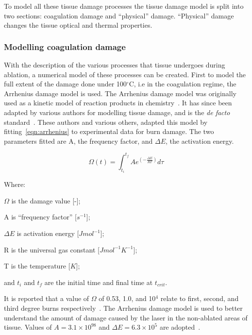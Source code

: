 To model all these tissue damage processes the tissue damage model is split into two sections: coagulation damage and ``physical'' damage. ``Physical'' damage changes the tissue optical and thermal properties.

\subsubsection*{Modelling coagulation damage}\label{sec:coagdamage}
With the description of the various processes that tissue undergoes during ablation, a numerical model of these processes can be created.
First to model the full extent of the damage done under 100${^{\circ}}$C, i.e in the coagulation regime, the Arrhenius damage model is used. The Arrhenius damage model was originally used as a kinetic model of reaction products in chemistry~\cite{pearce2009relationship}. It has since been adapted by various authors for modelling tissue damage, and is the \textit{de facto} standard~\cite{hendriques1947studies,jiang2002effects}. These authors and various others, adapted this model by fitting~\cref{eqn:arrhenius} to experimental data for burn damage. The two parameters fitted are A, the frequency factor, and $\Delta E$, the activation energy.

\begin{equation}
\Omega(t)=\int^{t_{f}}_{t_i} Ae^{(-\tfrac{\Delta E}{RT})}d\tau
\label{eqn:arrhenius}
\end{equation}


\noindent Where:

	\indent $\Omega$ is the damage value [-];
	
	\indent A is ``frequency factor'' [$s^{-1}$];
	
	\indent $\Delta E$ is activation energy [$J mol^{-1}$];
	
	\indent R is the universal gas constant [$J mol^{-1} K^{-1}$];
	
	\indent T is the temperature [$K$];
	
	\indent and $t_i$ and $t_f$ are the initial time and final time at $t_{crit}$.
	
	\medskip

It is reported that a value of $\Omega$ of 0.53, 1.0, and 10$^4$ relate to first, second, and third degree burns respectively~\cite{diller1983finite}. The Arrhenius damage model is used to better understand the amount of damage caused by the laser in the non-ablated areas of tissue. Values of $A=3.1\times10^{98}$ and $\Delta E=6.3\times10^5$ are adopted~\cite{zhang2007dynamic,sagi1992heating,hendriques1947studies}.

